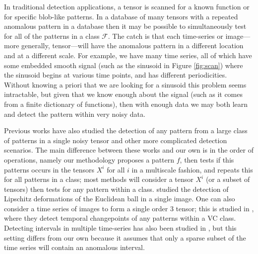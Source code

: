 
In traditional detection applications, a tensor is scanned for a known function or for specific blob-like patterns.
In a database of many tensors with a repeated anomalous pattern in a database then it may be possible to simultaneously test for all of the patterns in a class $\mathcal F$.
The catch is that each time-series or image---more generally, tensor---will have the anomalous pattern in a different location and at a different scale.
For example, we have many time series, all of which have some embedded smooth signal (such as the sinusoid in Figure \ref{fig:scan}) where the sinusoid begins at various time points, and has different periodicities.
Without knowing a priori that we are looking for a sinusoid this problem seems intractable, but given that we know enough about the signal (such as it comes from a finite dictionary of functions), then with enough data we may both learn and detect the pattern within very noisy data.

Previous works have also studied the detection of any pattern from a large class of patterns in a single noisy tensor and other more complicated detection scenarios.
The main difference between these works and our own is in the order of operations, namely our methodology proposes a pattern $f$, then tests if this patterns occurs in the tensors $X^i$ for all $i$ in a multiscale fashion, and repeats this for all patterns in a class; most methods will consider a tensor $X^i$ (or a subset of tensors) then tests for any pattern within a class.
\cite{cluster} studied the detection of Lipschitz deformations of the Euclidean ball in a single image.
One can also consider a time series of images to form a single order 3 tensor; this is studied in \cite{kifer2004detecting}, where they detect temporal changepoints of any patterns within a VC class.
Detecting intervals in multiple time-series has also been studied in \cite{chan2015optimal}, but this setting differs from our own because it assumes that only a sparse subset of the time series will contain an anomalous interval.

